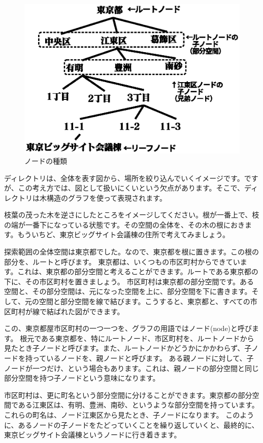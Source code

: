 \begin{figure}[htbp]
	\includegraphics[width=12cm,clip]{draw/node.eps}
	\caption{ノードの種類}
	\label{fig:address}
\end{figure}

ディレクトリは、全体を表す図から、場所を絞り込んでいくイメージです。ですが、この考え方では、図として扱いにくいという欠点があります。そこで、ディレクトリは木構造のグラフを使って表現されます。

枝葉の茂った木を逆さにしたところをイメージしてください。根が一番上で、枝の端が一番下になっている状態です。その空間の全体を、その木の根におきます。もういちど、東京ビッグサイト会議棟の住所で考えてみましょう。

探索範囲の全体空間は東京都でした。なので、東京都を根に置きます。この根の部分を、ルートと呼びます。
東京都は、いくつもの市区町村からできています。これは、東京都の部分空間と考えることができます。ルートである東京都の下に、その市区町村を置きましょう。
市区町村は東京都の部分空間です。ある空間と、その部分空間は、元になった空間を上に、部分空間を下に書きます。そして、元の空間と部分空間を線で結びます。こうすると、東京都と、すべての市区町村が線で結ばれた図ができます。

この、東京都屋市区町村の一つ一つを、グラフの用語ではノード(node)と呼びます。
根元である東京都を、特にルートノード、市区町村を、ルートノードから見たとき子ノードと呼びます。また、ルートノードかどうかにかかわらず、子ノードを持っているノードを、親ノードと呼びます。
ある親ノードに対して、子ノードが一つだけ、という場合もあります。これは、親ノードの部分空間と同じ部分空間を持つ子ノードという意味になります。

市区町村は、更に町名という部分空間に分けることができます。東京都の部分空間である江東区は、有明、豊洲、南砂、というような部分空間を持っています。これらの町名は、ノード江東区から見たとき、子ノードになります。
このように、あるノードの子ノードをたどっていくことを繰り返していくと、最終的に、東京ビッグサイト会議棟というノードに行き着きます。

